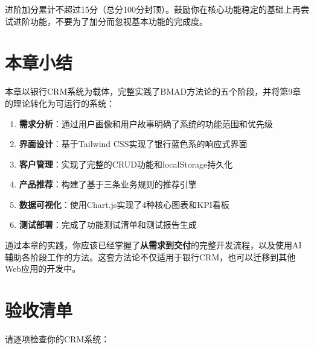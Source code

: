 \begin{notebox}[进阶加分上限]
进阶加分累计不超过15分（总分100分封顶）。鼓励你在核心功能稳定的基础上再尝试进阶功能，不要为了加分而忽视基本功能的完成度。
\end{notebox}

\section{本章小结}

本章以银行CRM系统为载体，完整实践了BMAD方法论的五个阶段，并将第9章的理论转化为可运行的系统：

\begin{enumerate}[leftmargin=2em]
  \item \textbf{需求分析}：通过用户画像和用户故事明确了系统的功能范围和优先级
  \item \textbf{界面设计}：基于Tailwind CSS实现了银行蓝色系的响应式界面
  \item \textbf{客户管理}：实现了完整的CRUD功能和localStorage持久化
  \item \textbf{产品推荐}：构建了基于三条业务规则的推荐引擎
  \item \textbf{数据可视化}：使用Chart.js实现了4种核心图表和KPI看板
  \item \textbf{测试部署}：完成了功能测试清单和测试报告生成
\end{enumerate}

通过本章的实践，你应该已经掌握了\textbf{从需求到交付}的完整开发流程，以及使用AI辅助各阶段工作的方法。这套方法论不仅适用于银行CRM，也可以迁移到其他Web应用的开发中。

\section{验收清单}

请逐项检查你的CRM系统：

